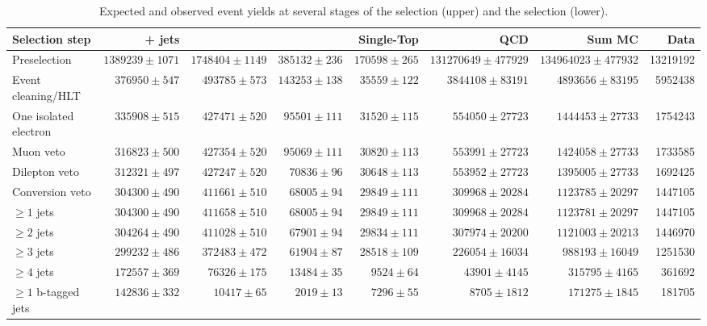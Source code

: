 \begin{table}
  \centering
   \caption{Expected and observed event yields at several stages of the \eplusjets selection (upper) and the
   \muplusjets selection (lower).}
    \label{tab:cut_flow_8TeV}
    \resizebox{\columnwidth}{!} {
    \begin{tabular}{lrrrrrrr}
    \hline
    \hline
	Selection step & \ttbar + jets & \WpJets & \ZpJets & Single-Top & QCD & Sum MC & Data \\
	\hline
	Preselection  &  $1389239 \pm 1071$ &  $1748404 \pm 1149$ &  $385132 \pm 236$ &  $170598 \pm 265$ &  $131270649 \pm 477929$ &  $134964023 \pm 477932$ &  13219192 \\ 
	Event cleaning/HLT  &  $376950 \pm 547$ &  $493785 \pm 573$ &  $143253 \pm 138$ &  $35559 \pm 122$ &  $3844108 \pm 83191$ &  $4893656 \pm 83195$ &  5952438 \\ 
	One isolated electron  &  $335908 \pm 515$ &  $427471 \pm 520$ &  $95501 \pm 111$ &  $31520 \pm 115$ &  $554050 \pm 27723$ &  $1444453 \pm 27733$ &  1754243 \\ 
	Muon veto  &  $316823 \pm 500$ &  $427354 \pm 520$ &  $95069 \pm 111$ &  $30820 \pm 113$ &  $553991 \pm 27723$ &  $1424058 \pm 27733$ &  1733585 \\ 
	Dilepton veto  &  $312321 \pm 497$ &  $427247 \pm 520$ &  $70836 \pm 96$ &  $30648 \pm 113$ &  $553952 \pm 27723$ &  $1395005 \pm 27733$ &  1692425 \\ 
	Conversion veto  &  $304300 \pm 490$ &  $411661 \pm 510$ &  $68005 \pm 94$ &  $29849 \pm 111$ &  $309968 \pm 20284$ &  $1123785 \pm 20297$ &  1447105 \\ 
	$\geq 1$ jets  &  $304300 \pm 490$ &  $411658 \pm 510$ &  $68005 \pm 94$ &  $29849 \pm 111$ &  $309968 \pm 20284$ &  $1123781 \pm 20297$ &  1447105 \\ 
	$\geq 2$ jets  &  $304264 \pm 490$ &  $411028 \pm 510$ &  $67901 \pm 94$ &  $29834 \pm 111$ &  $307974 \pm 20200$ &  $1121003 \pm 20213$ &  1446970 \\ 
	$\geq 3$ jets  &  $299232 \pm 486$ &  $372483 \pm 472$ &  $61904 \pm 87$ &  $28518 \pm 109$ &  $226054 \pm 16034$ &  $988193 \pm 16049$ &  1251530 \\ 
	$\geq 4$ jets  &  $172557 \pm 369$ &  $76326 \pm 175$ &  $13484 \pm 35$ &  $9524 \pm 64$ &  $43901 \pm 4145$ &  $315795 \pm 4165$ &  361692 \\ 
	$\geq 1$ b-tagged jets  &  $142836 \pm 332$ &  $10417 \pm 65$ &  $2019 \pm 13$ &  $7296 \pm 55$ &  $8705 \pm 1812$ &  $171275 \pm 1845$ &  181705 \\ 

\end{tabular}}
\end{table}
